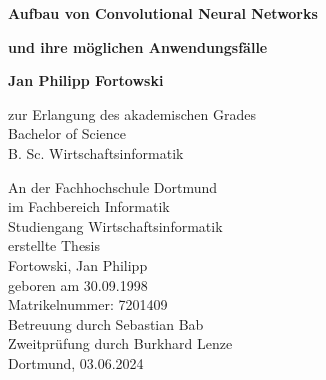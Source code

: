 \begin{titlepage}
   \begin{center}
       \vspace*{1cm}

       \Large
       \textbf{Aufbau von Convolutional Neural Networks}
	
	\large
       \vspace{0.5cm}
       \textbf{und ihre möglichen Anwendungsfälle}
            
       \normalsize
	
       \vspace{1.5cm}

       \textbf{Jan Philipp Fortowski}

       \vfill
            
       zur Erlangung des akademischen Grades\\
	   Bachelor of Science\\
	   B. Sc. Wirtschaftsinformatik \\
            
       \vspace{0.8cm}
     
        
       	An der Fachhochschule Dortmund\\
	im Fachbereich Informatik\\
	Studiengang Wirtschaftsinformatik\\
	erstellte Thesis\\
	\vspace{0.5cm}
	Fortowski, Jan Philipp\\
	geboren am 30.09.1998\\
	Matrikelnummer: 7201409\\
	Betreuung durch Sebastian Bab\\
	Zweitprüfung durch Burkhard Lenze\\
	\vspace{0.5cm}
	Dortmund, 03.06.2024 \\

            
   \end{center}
\end{titlepage}
